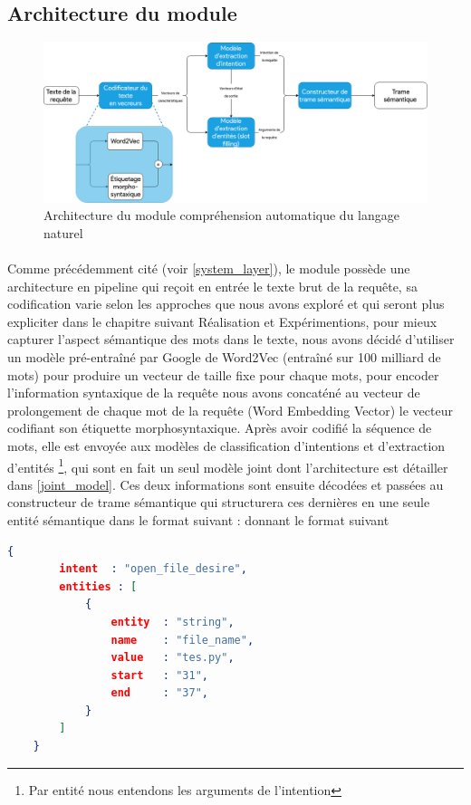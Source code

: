 	\subsection{Architecture du module}
	\begin{figure}[H] 
		\label{nlu_arch}
		\centering
		\includegraphics[width=0.88\linewidth]{images/Conception/NLU/nlu_module_arch.png}
		\caption{Architecture du module  compréhension automatique du langage naturel}
	\end{figure}
	\paragraph{}
	Comme précédemment cité (voir \ref{system_layer}), le module possède une architecture en pipeline qui reçoit en entrée le texte brut de la requête, sa codification varie selon les approches que nous avons exploré et qui seront plus expliciter dans le chapitre suivant Réalisation et Expérimentions, pour mieux capturer l'aspect sémantique des mots dans le texte, nous avons décidé d'utiliser un modèle pré-entraîné par Google de Word2Vec (entraîné sur 100 milliard de mots) pour produire un vecteur de taille fixe pour chaque mots, pour encoder l'information syntaxique de la requête nous avons concaténé au vecteur de prolongement de chaque mot de la requête (Word Embedding Vector) le vecteur codifiant son étiquette morphosyntaxique. Après avoir codifié la séquence de mots, elle est envoyée aux modèles de classification d'intentions et d'extraction d'entités \footnote{Par entité nous entendons les arguments de l'intention}, qui sont en fait un seul modèle joint dont l'architecture est détailler dans \ref{joint_model}. Ces deux informations sont ensuite décodées et passées au constructeur de trame sémantique qui structurera ces dernières en une seule entité sémantique dans le format suivant : 
	donnant le format suivant \begin{lstlisting}[language=json]
	{
		intent  : "open_file_desire",
		entities : [
			{	
				entity	: "string",
				name	: "file_name",
				value	: "tes.py",
				start	: "31",
				end		: "37",
			}
		]
	}
	\end{lstlisting}
	
